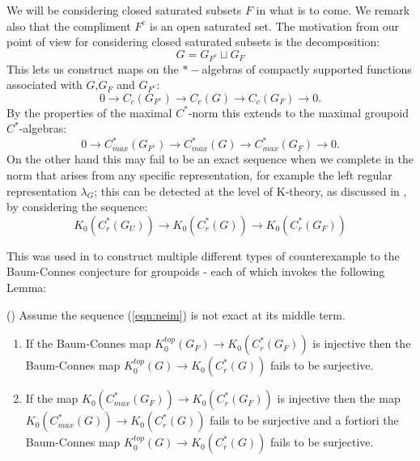 We will be considering closed saturated subsets $F$ in what is to come. We remark also that the compliment $F^{c}$ is an open saturated set. The motivation from our point of view for considering closed saturated subsets is the decomposition:
\begin{equation*}
G = G_{F^{c}}\sqcup G_{F}
\end{equation*}
This lets us construct maps on the $*-$algebras of compactly supported functions associated with $G$,$G_{F}$ and $G_{F^{c}}$:
\begin{equation*}
0 \rightarrow C_{c}(G_{F^{c}}) \rightarrow C_{c}(G) \rightarrow C_{c}(G_{F}) \rightarrow 0.
\end{equation*}
By the properties of the maximal $C^{*}$-norm this extends to the maximal groupoid $C^{*}$-algebras:
\begin{equation*}
0 \rightarrow C_{max}^{*}(G_{F^{c}}) \rightarrow C_{max}^{*}(G) \rightarrow C_{max}^{*}(G_{F}) \rightarrow 0.
\end{equation*}
On the other hand this may fail to be an exact sequence when we complete in the norm that arises from any specific representation, for example the left regular representation $\lambda_{G}$; this can be detected at the level of K-theory, as discussed in \cite{MR1911663}, by considering the sequence:
\begin{equation}\label{eqn:neim}
K_{0}(C^{*}_{r}(G_{U}))\rightarrow K_{0}(C^{*}_{r}(G)) \rightarrow K_{0}(C^{*}_{r}(G_{F}))
\end{equation}

This was used in \cite{MR1911663} to construct multiple different types of counterexample to the Baum-Connes conjecture for groupoids - each of which invokes the following Lemma:
\begin{lemma}\label{Lem:Lemma1}(\cite[Lemma 1]{MR1911663})
Assume the sequence (\ref{eqn:neim}) is not exact at its middle term.
\begin{enumerate}
\item If the Baum-Connes map $K_{0}^{top}(G_{F}) \rightarrow K_{0}(C^{*}_{r}(G_{F}))$ is injective then the Baum-Connes map $K_{0}^{top}(G) \rightarrow K_{0}(C^{*}_{r}(G))$ fails to be surjective.
\item If the map $K_{0}(C^{*}_{max}(G_{F})) \rightarrow K_{0}(C^{*}_{r}(G_{F}))$ is injective then the map $K_{0}(C^{*}_{max}(G)) \rightarrow K_{0}(C^{*}_{r}(G))$ fails to be surjective and a fortiori the Baum-Connes map $K_{0}^{top}(G) \rightarrow K_{0}(C^{*}_{r}(G))$ fails to be surjective.
\end{enumerate}
\end{lemma}

